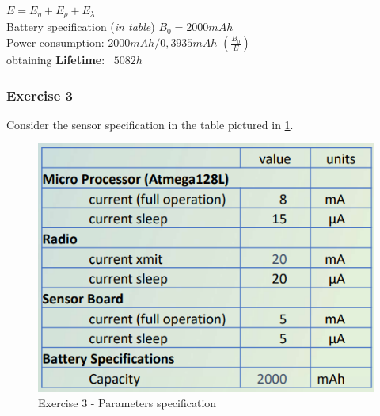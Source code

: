\documentclass[10pt,a4paper]{report}
\theoremstyle{definition}
\begin{document}
\begin{center}
	$E = E_{\eta} + E_{\rho} + E_{\lambda}$\\
	Battery specification (\textit{in table}) $B_{0} = 2000mAh$\\
	Power consumption: $2000 mAh / 0,3935 mAh$     $(\frac{B_{0}}{E})$\\
	obtaining \textbf{Lifetime}:  $5082 h$
\end{center}




\subsubsection{Exercise 3}\label{sec:exercise-3}
Consider the sensor specification in the table pictured in \ref{energy-ex3}.
\begin{figure}
	\centering\includegraphics[scale=0.50]{images/Pasted image 20230328162514.png}
	\caption{Exercise 3 - Parameters specification}
	\label{energy-ex3}
\end{figure}
\end{document}
